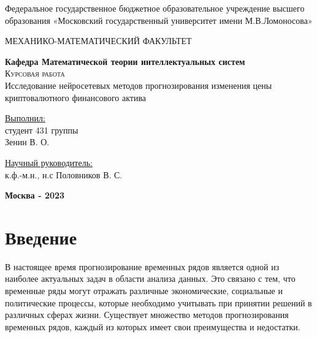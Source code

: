 \documentclass[diploma]{nanolab2015}
\begin{document}
\begin{titlepage}
    \begin{center}
        \large
        Федеральное государственное бюджетное образовательное учреждение
        высшего образования «Московский государственный университет имени
        М.В.Ломоносова»

        МЕХАНИКО-МАТЕМАТИЧЕСКИЙ ФАКУЛЬТЕТ

        \textbf{Кафедра Математической теории интеллектуальных систем}\\
        \vspace{4cm}
        \textsc{\Large Курсовая работа}\\[5mm]
        {\LARGE Исследование нейросетевых методов прогнозирования изменения цены криптовалютного финансового актива}
    \end{center}
    \vspace{3cm}
    \null

    \begin{flushright}
        \normalsize \underline{Выполнил:}
        \\студент 431 группы
        \\Зенин В. О.
        \\ \underline{\hspace{4cm}}
    \end{flushright}
    \vspace{1cm}

    \begin{flushright}
        \normalsize \underline{Научный руководитель:}
        \\к.ф.-м.н., н.с Половников В. С.
        \\ \underline{\hspace{4cm}}
    \end{flushright}

    \vfill
    \begin{center}
        \textbf{Москва - 2023}
    \end{center}
\end{titlepage}
\setcounter{page}{3}
\clearpage
\tableofcontents{}  %
\clearpage
\chapter{Введение}
В настоящее время прогнозирование временных рядов является одной из наиболее актуальных задач в области анализа данных. Это связано с тем, что временные ряды могут отражать различные экономические, социальные и политические процессы, которые необходимо учитывать при принятии решений в различных сферах жизни. Существует множество методов прогнозирования временных рядов, каждый из которых имеет свои преимущества и недостатки.
\end{document}
